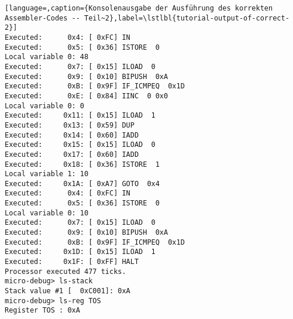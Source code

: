\begin{lstlisting}[language=,caption={Konsolenausgabe der Ausführung des korrekten Assembler-Codes -- Teil~2},label=\lstlbl{tutorial-output-of-correct-2}]
Executed:      0x4: [ 0xFC] IN 
Executed:      0x5: [ 0x36] ISTORE  0
Local variable 0: 48
Executed:      0x7: [ 0x15] ILOAD  0
Executed:      0x9: [ 0x10] BIPUSH  0xA
Executed:      0xB: [ 0x9F] IF_ICMPEQ  0x1D
Executed:      0xE: [ 0x84] IINC  0 0x0
Local variable 0: 0
Executed:     0x11: [ 0x15] ILOAD  1
Executed:     0x13: [ 0x59] DUP 
Executed:     0x14: [ 0x60] IADD 
Executed:     0x15: [ 0x15] ILOAD  0
Executed:     0x17: [ 0x60] IADD 
Executed:     0x18: [ 0x36] ISTORE  1
Local variable 1: 10
Executed:     0x1A: [ 0xA7] GOTO  0x4
Executed:      0x4: [ 0xFC] IN 
Executed:      0x5: [ 0x36] ISTORE  0
Local variable 0: 10
Executed:      0x7: [ 0x15] ILOAD  0
Executed:      0x9: [ 0x10] BIPUSH  0xA
Executed:      0xB: [ 0x9F] IF_ICMPEQ  0x1D
Executed:     0x1D: [ 0x15] ILOAD  1
Executed:     0x1F: [ 0xFF] HALT 
Processor executed 477 ticks.
micro-debug> ls-stack
Stack value #1 [  0xC001]: 0xA
micro-debug> ls-reg TOS
Register TOS : 0xA
\end{lstlisting}
